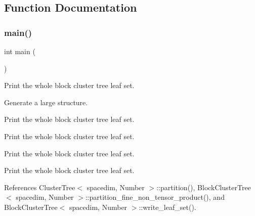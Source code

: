 \subsection{Function Documentation}
\mbox{\label{bct-hp-fine-ntp_8cc_ae66f6b31b5ad750f1fe042a706a4e3d4}} 
\subsubsection{\texorpdfstring{main()}{main()}}
{\footnotesize\ttfamily int main (\begin{DoxyParamCaption}{ }\end{DoxyParamCaption})}

Print the whole block cluster tree leaf set.

Generate a large structure.

Print the whole block cluster tree leaf set.

Print the whole block cluster tree leaf set.

Print the whole block cluster tree leaf set.

Print the whole block cluster tree leaf set.

References Cluster\+Tree$<$ spacedim, Number $>$\+::partition(), Block\+Cluster\+Tree$<$ spacedim, Number $>$\+::partition\+\_\+fine\+\_\+non\+\_\+tensor\+\_\+product(), and Block\+Cluster\+Tree$<$ spacedim, Number $>$\+::write\+\_\+leaf\+\_\+set().

